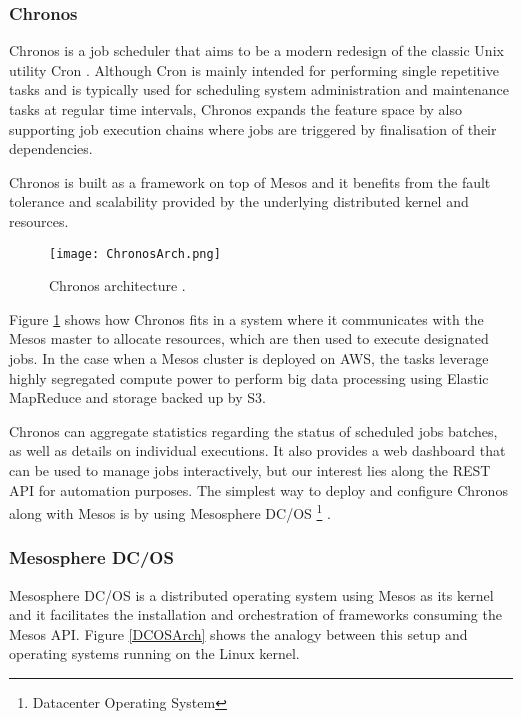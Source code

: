 \subsubsection{Chronos}

Chronos \cite{Chronos} is a job scheduler that aims to be a modern redesign of the classic Unix utility Cron \cite{Cron}. Although Cron is mainly intended for performing single repetitive tasks and is typically used for scheduling system administration and maintenance tasks at regular time intervals, Chronos expands the feature space by also supporting job execution chains where jobs are triggered by finalisation of their dependencies. 

Chronos is built as a framework on top of Mesos and it benefits from the fault tolerance and scalability provided by the underlying distributed kernel and resources.

\begin{figure}[h]
	\centering
		\texttt{[image: ChronosArch.png]}
	\caption{Chronos architecture \cite{ChronosArch}. }
	\label{ChronosArch}
\end{figure}

Figure \ref{ChronosArch} shows how Chronos fits in a system where it communicates with the Mesos master to allocate resources, which are then used to execute designated jobs. In the case when a Mesos cluster is deployed on AWS, the tasks leverage highly segregated compute power to perform big data processing using Elastic MapReduce \cite{EMR} and storage backed up by S3.

Chronos can aggregate statistics regarding the status of scheduled jobs batches, as well as details on individual executions. It also provides a web dashboard that can be used to manage jobs interactively, but our interest lies along the REST API for automation purposes. The simplest way to deploy and configure Chronos along with Mesos is by using Mesosphere DC/OS \footnote{Datacenter Operating System} \cite{DCOS}.

\subsubsection{Mesosphere DC/OS}

Mesosphere DC/OS is a distributed operating system using Mesos as its kernel and it facilitates the installation and orchestration of frameworks consuming the Mesos API. Figure \ref{DCOSArch} shows the analogy between this setup and operating systems running on the Linux kernel.

